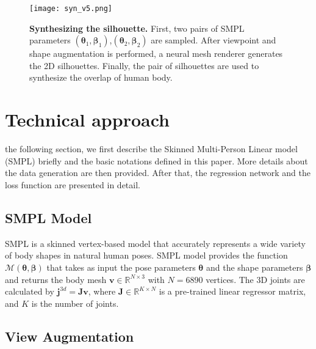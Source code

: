 \documentclass[journal]{IEEEtran}
\begin{document}
\begin{figure*}[!htp]
    \centerline{\texttt{[image: syn\_v5.png]}}
    \caption{\textbf{Synthesizing the silhouette.} First, two pairs of SMPL parameters $(\bm{\theta}_1, \bm{\beta}_1)$,$(\bm{\theta}_2, \bm{\beta}_2)$ are sampled. After viewpoint and shape augmentation is performed, a neural mesh renderer generates the 2D silhouettes. Finally, the pair of silhouettes are used to synthesize the overlap of human body.}
    \label{fig:syn_input}
\end{figure*}



\quad 

\section{Technical approach}
 the following section, we first describe the Skinned Multi-Person Linear model (SMPL) briefly and the basic notations defined in this paper. More details about the data generation are then provided. After that, the regression network and the loss function are presented in detail.

\subsection{SMPL Model}
 SMPL is a skinned vertex-based model that accurately represents a wide variety of body shapes in natural human poses. SMPL model provides the function $\mathcal{M}(\bm{\theta}, \bm{\beta})$ that takes as input the pose parameters $\bm{\theta}$ and the shape parameters $\bm{\beta}$ and returns the body mesh $\bm{v} \in \mathbb{R}^{N \times 3}$ with $N=6890$ vertices. The 3D joints are calculated by $\bm{j}^{3d}=\bm{J}\bm{v}$, where $\bm{J}\in \mathbb{R}^{K \times N}$ is a pre-trained linear regressor matrix, and $K$ is the number of joints.  
\subsection{View Augmentation}
\end{document}
